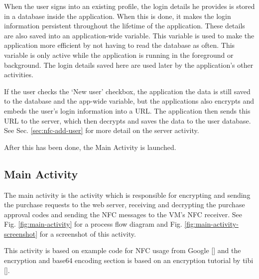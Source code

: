 When the user signs into an existing profile, the login details he provides
is stored in a database inside the application. When this is done, it
makes the login information persistent throughout the lifetime of the application. These
details are also saved into an application-wide variable. This variable is used to make
the application more efficient by not having to read the database as often. This variable
is only active while the application is running in the foreground or background. The
login details saved here are used later by the application's other activities.

If the user checks the `New user' checkbox, the application the data is
still saved to the database and the app-wide variable, but the
applications also encrypts and embeds the user's login information into a URL.
The application then sends this URL to the server, which then decrypts and saves
the data to the user database. See Sec. \ref{sec:nfc-add-user} for more detail on
the server activity.

After this has been done, the Main Activity is launched. 

\subsection{Main Activity}

The main activity is the activity which is responsible for encrypting and
sending the purchase requests to the web server, receiving and decrypting
the purchase approval codes and sending the NFC messages to the VM's
NFC receiver. See Fig. \ref{fig:main-activity} for a process flow diagram
and Fig. \ref{fig:main-activity-screenshot} for a screenshot of this activity.

This activity is based on example code for NFC usage from Google
[\cite{website:google-nfc}] and the encryption and base64 encoding section is
based on an encryption tutorial by tibi [\cite{article:android-encryption}].

